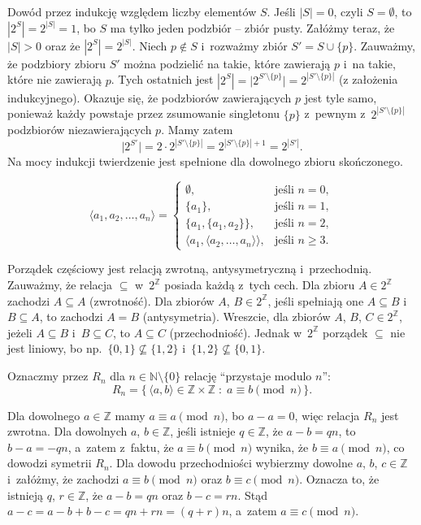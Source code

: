 \exercise %
Dowód przez indukcję względem liczby elementów $S$. Jeśli $|S|=0$, czyli $S=\emptyset$, to $|2^S|=2^{|S|}=1$, bo $S$ ma tylko jeden podzbiór -- zbiór pusty. Załóżmy teraz, że $|S|>0$ oraz że $|2^S|=2^{|S|}$. Niech $p\not\in S$ i~rozważmy zbiór $S'=S\cup\{p\}$. Zauważmy, że podzbiory zbioru $S'$ można podzielić na takie, które zawierają $p$ i~na takie, które nie zawierają $p$. Tych ostatnich jest $|2^S|=\bigl|2^{S'\setminus\{p\}}\bigr|=2^{|S'\setminus\{p\}|}$ (z założenia indukcyjnego). Okazuje się, że podzbiorów zawierających $p$ jest tyle samo, ponieważ każdy powstaje przez zsumowanie singletonu $\{p\}$ z~pewnym z~$2^{|S'\setminus\{p\}|}$ podzbiorów niezawierających $p$. Mamy zatem
\[
	\bigl|2^{S'}\bigr|=2\cdot2^{|S'\setminus\{p\}|} = 2^{|S'\setminus\{p\}|+1} = 2^{|S'|}.
\]
Na mocy indukcji twierdzenie jest spełnione dla dowolnego zbioru skończonego.

\exercise %
\[
	\langle a_1,a_2,\dots,a_n\rangle =
	\begin{cases}
		\emptyset, & \text{jeśli $n=0$}, \\
		\{a_1\}, & \text{jeśli $n=1$}, \\
		\{a_1,\{a_1,a_2\}\}, & \text{jeśli $n=2$}, \\
		\langle a_1,\langle a_2,\dots,a_n\rangle\rangle, & \text{jeśli $n\ge3$}.
	\end{cases}
\]


\exercise %
Porządek częściowy jest relacją zwrotną, antysymetryczną i~przechodnią. Zauważmy, że relacja $\subseteq$ w~$2^\mathbb{Z}$ posiada każdą z~tych cech. Dla zbioru $A\in2^\mathbb{Z}$ zachodzi $A\subseteq A$ (zwrotność). Dla zbiorów $A$, $B\in2^\mathbb{Z}$, jeśli spełniają one $A\subseteq B$ i~$B\subseteq A$, to zachodzi $A=B$ (antysymetria). Wreszcie, dla zbiorów $A$, $B$, $C\in2^\mathbb{Z}$, jeżeli $A\subseteq B$ i~$B\subseteq C$, to $A\subseteq C$ (przechodniość). Jednak w~$2^\mathbb{Z}$ porządek $\subseteq$ nie jest liniowy, bo np.\ $\{0,1\}\not\subseteq\{1,2\}$ i~$\{1,2\}\not\subseteq\{0,1\}$.

\exercise %
Oznaczmy przez $R_n$ dla $n\in\mathbb{N}\setminus\{0\}$ relację ``przystaje modulo $n$'':
\[
	R_n = \bigl\{\,\langle a,b\rangle\in\mathbb{Z}\times\mathbb{Z}\;:\;a\equiv b\!\!\!\pmod{n}\,\bigr\}.
\]

Dla dowolnego $a\in\mathbb{Z}$ mamy $a\equiv a\pmod{n}$, bo $a-a=0$, więc relacja $R_n$ jest zwrotna. Dla dowolnych $a$, $b\in\mathbb{Z}$, jeśli istnieje $q\in\mathbb{Z}$, że $a-b=qn$, to $b-a=-qn$, a~zatem z~faktu, że $a\equiv b\pmod{n}$ wynika, że $b\equiv a\pmod{n}$, co dowodzi symetrii $R_n$. Dla dowodu przechodniości wybierzmy dowolne $a$, $b$, $c\in\mathbb{Z}$ i~załóżmy, że zachodzi $a\equiv b\pmod{n}$ oraz $b\equiv c\pmod{n}$. Oznacza to, że istnieją $q$, $r\in\mathbb{Z}$, że $a-b=qn$ oraz $b-c=rn$. Stąd $a-c=a-b+b-c=qn+rn=(q+r)n$, a~zatem $a\equiv c\pmod{n}$.

